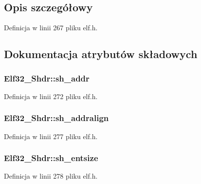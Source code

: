 \subsection{Opis szczegółowy}


Definicja w linii 267 pliku elf.\-h.



\subsection{Dokumentacja atrybutów składowych}
\hypertarget{struct_elf32___shdr_a7e668a62cee74a2f9c6edabb5f45635a}{
\subsubsection[{sh\-\_\-addr}]{ Elf32\-\_\-\-Shdr\-::sh\-\_\-addr}}\label{struct_elf32___shdr_a7e668a62cee74a2f9c6edabb5f45635a}


Definicja w linii 272 pliku elf.\-h.

\hypertarget{struct_elf32___shdr_a399f50b3591e6286d4ad819f790979ed}{
\subsubsection[{sh\-\_\-addralign}]{ Elf32\-\_\-\-Shdr\-::sh\-\_\-addralign}}\label{struct_elf32___shdr_a399f50b3591e6286d4ad819f790979ed}


Definicja w linii 277 pliku elf.\-h.

\hypertarget{struct_elf32___shdr_a10c59cecc928aae27930601fe545d3ca}{
\subsubsection[{sh\-\_\-entsize}]{ Elf32\-\_\-\-Shdr\-::sh\-\_\-entsize}}\label{struct_elf32___shdr_a10c59cecc928aae27930601fe545d3ca}


Definicja w linii 278 pliku elf.\-h.

